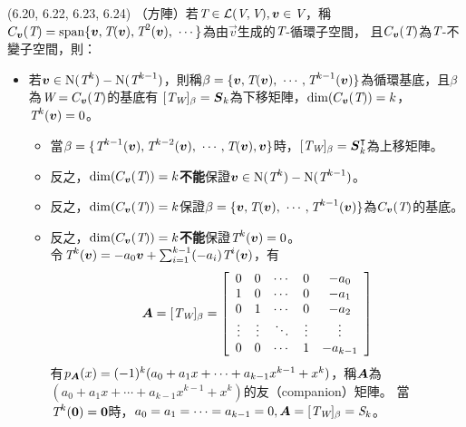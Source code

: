 \item \begin{theorem}{(6.20, 6.22, 6.23, 6.24)} （方陣）若$\textit{T} \in \mathcal{L}(\textit{V}, \textit{V}), \boldsymbol{v} \in \textit{V}$，稱\\$C_{\vec{v}}(\T) = \spn\{\vec{v}, \T(\vec{v}), \T^2(\vec{v}), \ \cdots\}$為由$\vec{v}$生成的$\textit{T}$-循環子空間，
	且$C_{\boldsymbol{v}}(\textit{T})$為$\textit{T}$-不變子空間，則：
	\begin{itemize}
		\item 若$\boldsymbol{v} \in \operatorname{N}(\textit{T}^k) - \operatorname{N}(\textit{T}^{k - 1})$，則稱$\beta = \{\boldsymbol{v}, \textit{T}(\boldsymbol{v}), \ \cdots, \textit{T}^{k - 1}(\boldsymbol{v})\}$為循環基底，且$\beta$為$\textit{W} = C_{\boldsymbol{v}}(\textit{T})$的基底有
		$[\textit{T}_{\textit{W}}]_{\beta} = \boldsymbol{S}_k$為下移矩陣，$\dim(C_{\boldsymbol{v}}(\textit{T})) = k$，$\textit{T}^k(\boldsymbol{v}) = 0$。
		\begin{itemize}
			\item 當$\beta = \{\textit{T}^{k - 1}(\boldsymbol{v}), \textit{T}^{k - 2}(\boldsymbol{v}), \ \cdots, \textit{T}(\boldsymbol{v}), \boldsymbol{v}\}$時，$[\textit{T}_{\textit{W}}]_{\beta} = \boldsymbol{S}^\intercal_k$為上移矩陣。
			\item 反之，$\dim(C_{\boldsymbol{v}}(\textit{T})) = k$\textbf{不能}保證$\boldsymbol{v} \in \operatorname{N}(\textit{T}^k) - \operatorname{N}(\textit{T}^{k - 1})$。
			\item 反之，$\dim(C_{\boldsymbol{v}}(\textit{T})) = k$保證$\beta = \{\boldsymbol{v}, \textit{T}(\boldsymbol{v}), \ \cdots, \textit{T}^{k - 1}(\boldsymbol{v})\}$為$C_{\boldsymbol{v}}(\textit{T})$的基底。
			\item 反之，$\dim(C_{\boldsymbol{v}}(\textit{T})) = k$\textbf{不能}保證$\textit{T}^k(\boldsymbol{v}) = 0$。\\
				令$\textit{T}^k(\boldsymbol{v}) = -a_0\boldsymbol{v} + \sum_{i = 1}^{k - 1}(-a_{i})\textit{T}^{i}(\boldsymbol{v})$，有
				\begin{equation}
					\boldsymbol{A} = [\textit{T}_{\textit{W}}]_{\beta} = 
					{\left[ 
					\begin{array}{ccccc}
						0 & 0 & \cdots & 0 & -a_0 \\
						1 & 0 & \cdots & 0 & -a_1 \\
						0 & 1 & \cdots & 0 & -a_2 \\
						\vdots & \vdots & \ddots & \vdots & \vdots \\
						0 & 0 & \cdots & 1 & -a_{k - 1} \\
					\end{array} 
					\right]}
				\end{equation}
				有$p_{\boldsymbol{A}}(x) = (-1)^k(a_0 + a_1x + \cdots + a_{k - 1}x^{k - 1} + x^k)$，稱$\boldsymbol{A}$為$(a_0 + a_1x + \cdots + a_{k - 1}x^{k - 1} + x^k)$的友（companion）矩陣。
				當$\textit{T}^k(\boldsymbol{0}) = \boldsymbol{0}$時，$a_0 = a_1 = \cdots = a_{k - 1} = 0, \boldsymbol{A} = [\textit{T}_{\textit{W}}]_{\beta} = \textit{S}_k$。
		\end{itemize}
	\end{itemize}
\end{theorem}

